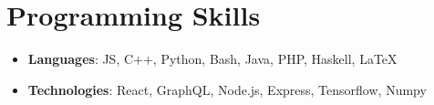 \documentclass[letterpaper,11pt]{article}
\newcommand{\resumeSubHeadingListStart}{\begin{itemize}[leftmargin=*]}
\newcommand{\resumeSubHeadingListEnd}{\end{itemize}}
\begin{document}
\section{Programming Skills}
  \resumeSubHeadingListStart
    \item{
      \textbf{Languages}{: JS, C++, Python, Bash, Java, PHP, Haskell, LaTeX}
    }
    \item{
      \textbf{Technologies}{: React, GraphQL, Node.js, Express, Tensorflow, Numpy }
    }
  \resumeSubHeadingListEnd


\end{document}
